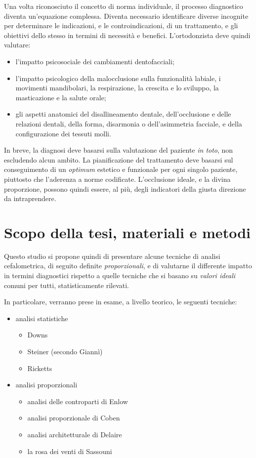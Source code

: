 Una volta riconosciuto il concetto di norma individuale, il processo diagnostico diventa un'equazione complessa. Diventa necessario identificare diverse incognite per determinare le indicazioni, e le controindicazioni, di un trattamento, e gli obiettivi dello stesso in termini di necessità e benefici. L'ortodonzista deve quindi valutare:

\begin{itemize}
\item l'impatto psicosociale dei cambiamenti dentofacciali;
\item l'impatto psicologico della malocclusione sulla funzionalità labiale, i movimenti mandibolari, la respirazione, la crescita e lo sviluppo, la masticazione e la salute orale;
\item gli aspetti anatomici del disallineamento dentale, dell'occlusione e delle relazioni dentali, della forma, disarmonia o dell'asimmetria facciale, e della configurazione dei tessuti molli.
\end{itemize}

In breve, la diagnosi deve basarsi sulla valutazione del paziente \textit{in toto}, non escludendo alcun ambito. La pianificazione del trattamento deve basarsi sul conseguimento di un \textit{optimum} estetico e funzionale per ogni singolo paziente, piuttosto che l'aderenza a norme codificate. L'occlusione ideale, e la divina proporzione, possono quindi essere, al più, degli indicatori della giusta direzione da intraprendere.

\section{Scopo della tesi, materiali e metodi}
Questo studio si propone quindi di presentare alcune tecniche di analisi cefalometrica, di seguito definite \textit{proporzionali}, e di valutarne il differente impatto in termini diagnostici rispetto a quelle tecniche che si basano su \textit{valori ideali} comuni per tutti, statisticamente rilevati.

In particolare, verranno prese in esame, a livello teorico, le seguenti tecniche:
\begin{itemize}
\item analisi statistiche
\begin{itemize}
\item Downs
\item Steiner (secondo Giannì)
\item Ricketts
\end{itemize}
\item analisi proporzionali
\begin{itemize}
\item analisi delle controparti di Enlow
\item analisi proporzionale di Coben
\item analisi architetturale di Delaire
\item la rosa dei venti di Sassouni
\end{itemize}
\end{itemize}

